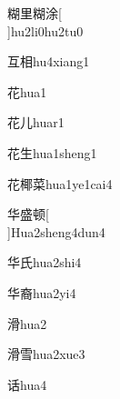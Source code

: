\begin{verbete}[15;7;15;10]{糊里糊涂}[\\]{hu2li0hu2tu0}
\end{verbete}

\begin{verbete}[4;9]{互相}{hu4xiang1}
\end{verbete}

\begin{verbete}[7]{花}{hua1}
\end{verbete}

\begin{verbete}[7;2]{花儿}{huar1}
\end{verbete}

\begin{verbete}[7;5]{花生}{hua1sheng1}
\end{verbete}

\begin{verbete}[7;12;11]{花椰菜}{hua1ye1cai4}
\end{verbete}

\begin{verbete}[6;11;10]{华盛顿}[\\]{Hua2sheng4dun4}
\end{verbete}

\begin{verbete}[6;4]{华氏}{hua2shi4}
\end{verbete}

\begin{verbete}[6;13]{华裔}{hua2yi4}
\end{verbete}

\begin{verbete}[12]{滑}{hua2}
\end{verbete}

\begin{verbete}[12;11]{滑雪}{hua2xue3}
\end{verbete}

\begin{verbete}[8]{话}{hua4}
\end{verbete}


